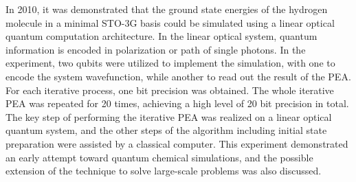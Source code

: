 \documentclass[8.5pt,twoside,twocolumn]{article}
\begin{document}
In 2010, it was demonstrated that the ground state energies of the hydrogen molecule in a minimal STO-3G basis could be simulated using a linear optical quantum
computation architecture.\cite{Optics_static}
In the linear optical system,
quantum information is encoded in polarization
or path of single photons.\cite{Optics_review_1,Optics_review_2}
In the experiment, two qubits were utilized to
implement the simulation, with one to encode the system wavefunction,
while another to read out the result of the PEA.
For each iterative process, one bit precision was obtained.
The whole iterative PEA was repeated for 20 times,
achieving a high level of 20 bit precision in total.
The key step of performing the iterative PEA was realized on a linear optical quantum system, and
the other steps of the algorithm including initial state preparation were assisted by a classical computer.
This experiment demonstrated an early attempt toward quantum chemical
simulations, and the possible extension of the technique to solve large-scale problems was also discussed.
\end{document}
